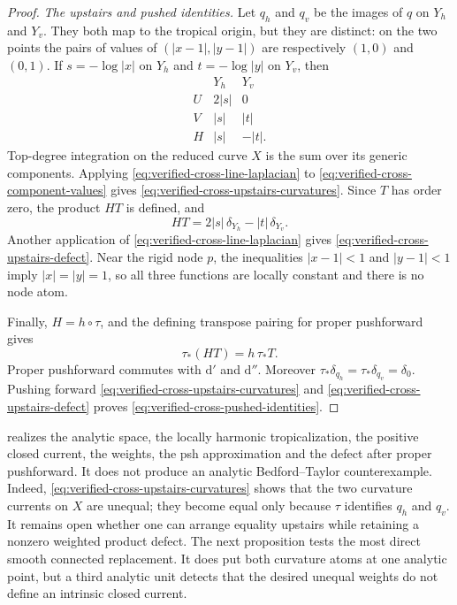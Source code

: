 \begin{proof}
\emph{The upstairs and pushed identities.}
Let \(q_h\) and \(q_v\) be the images of \(q\) on \(Y_h\) and \(Y_v\).
They both map to the tropical origin, but they are distinct: on the two
points the pairs of values of \((|x-1|,|y-1|)\) are respectively
\((1,0)\) and \((0,1)\).  If
\(s=-\log|x|\) on \(Y_h\) and \(t=-\log|y|\) on \(Y_v\), then
\[
\begin{array}{c|cc}
 &Y_h&Y_v\\ \hline
U&2|s|&0\\
V&|s|&|t|\\
H&|s|&-|t|.
\end{array}
\tag{69.13j}\label{eq:verified-cross-component-values}
\]
Top-degree integration on the reduced curve \(X\) is the sum over its
generic components.  Applying \eqref{eq:verified-cross-line-laplacian} to
\eqref{eq:verified-cross-component-values} gives
\eqref{eq:verified-cross-upstairs-curvatures}.  Since \(T\) has order zero,
the product \(HT\) is defined, and
\[
                   HT=2|s|\,\delta_{Y_h}
                         -|t|\,\delta_{Y_v}.
\]
Another application of \eqref{eq:verified-cross-line-laplacian} gives
\eqref{eq:verified-cross-upstairs-defect}.  Near the rigid node \(p\), the
inequalities \(|x-1|<1\) and \(|y-1|<1\) imply \(|x|=|y|=1\), so all three
functions are locally constant and there is no node atom.

Finally, \(H=h\circ\tau\), and the defining transpose pairing for proper
pushforward gives
\[
                         \tau_*(HT)=h\,\tau_*T.
\]
Proper pushforward commutes with \(\mathrm d'\) and \(\mathrm d''\).
Moreover \(\tau_*\delta_{q_h}=\tau_*\delta_{q_v}=\delta_0\).
Pushing forward
\eqref{eq:verified-cross-upstairs-curvatures} and
\eqref{eq:verified-cross-upstairs-defect} proves
\eqref{eq:verified-cross-pushed-identities}.
\end{proof}

\begin{remark}
\label{rem:verified-cross-upstairs-firewall}
 realizes the analytic space,
the locally harmonic tropicalization, the positive closed current, the
weights, the psh approximation and the defect after proper pushforward.  It
does not produce an analytic Bedford--Taylor counterexample.  Indeed,
\eqref{eq:verified-cross-upstairs-curvatures} shows that the two curvature
currents on $X$ are unequal; they become equal only because $\tau$
identifies $q_h$ and $q_v$.  It remains open whether one can arrange
equality upstairs while retaining a nonzero weighted product defect.  The
next proposition tests the most direct smooth connected replacement.  It
does put both curvature atoms at one analytic point, but a third analytic
unit detects that the desired unequal weights do not define an intrinsic
closed current.
\end{remark}

